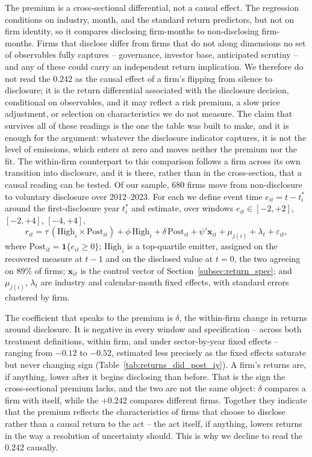 \documentclass[a4paper,12pt]{article}
\begin{document}
The premium is a cross-sectional differential, not a causal effect. The regression conditions on industry, month, and the standard return predictors, but not on firm identity, so it compares disclosing firm-months to non-disclosing firm-months. Firms that disclose differ from firms that do not along dimensions no set of observables fully captures -- governance, investor base,
anticipated scrutiny -- and any of these could carry an independent return implication. We therefore do not read the $0.242$ as the causal effect of a firm's
flipping from silence to disclosure; it is the return differential associated with the disclosure decision, conditional on observables, and it may reflect a risk premium, a slow price adjustment, or selection on characteristics we do not measure. The claim that survives all of these readings is the one the table was built to make, and it is enough for the argument: whatever the disclosure indicator captures, it is not the level of emissions, which enters at zero and moves neither the premium nor the fit. The within-firm counterpart to this comparison follows a firm across its own transition into disclosure, and it is there, rather than in the cross-section, that a causal reading can be tested. Of our sample, $680$ firms move from non-disclosure to voluntary disclosure over 2012--2023. For each we define event time $e_{it} = t - t^{\ast}_i$ around the first-disclosure year $t^{\ast}_i$ and estimate, over windows $e_{it} \in [-2,+2]$, $[-2,+4]$, $[-4,+4]$,
\begin{equation}
\label{eq:did}
r_{it} = \tau\,(\mathrm{High}_i \times \mathrm{Post}_{it})
       + \phi\,\mathrm{High}_i + \delta\,\mathrm{Post}_{it}
       + \psi' \mathbf{x}_{it} + \mu_{j(i)} + \lambda_t + \varepsilon_{it},
\end{equation}
where $\mathrm{Post}_{it} = \mathbf{1}\{e_{it} \geq 0\}$; $\mathrm{High}_i$ is a top-quartile emitter, assigned on the recovered measure at $t-1$ and on the disclosed value at $t=0$, the two agreeing on $89\%$ of firms; $\mathbf{x}_{it}$ is the control vector of Section~\ref{subsec:return_spec}; and $\mu_{j(i)}$, $\lambda_t$ are industry and calendar-month fixed effects, with standard errors clustered by firm.

The coefficient that speaks to the premium is $\delta$, the within-firm change in returns around disclosure. It is negative in every window and specification -- across both treatment definitions, within firm, and under sector-by-year fixed effects -- ranging from $-0.12$ to $-0.52$, estimated less precisely as the fixed effects saturate but never changing sign (Table~\ref{tab:returns_did_post_iy}). A firm's returns are, if anything, lower after it begins disclosing than before. That is the sign the cross-sectional premium lacks, and the two are not the same object: $\delta$ compares a firm with itself, while the $+0.242$ compares different firms. Together they indicate that the premium reflects the characteristics of firms that choose to disclose rather than a causal return to the act -- the act itself, if anything, lowers returns in the way a resolution of uncertainty should. This is why we decline to read the $0.242$ causally.
\end{document}
